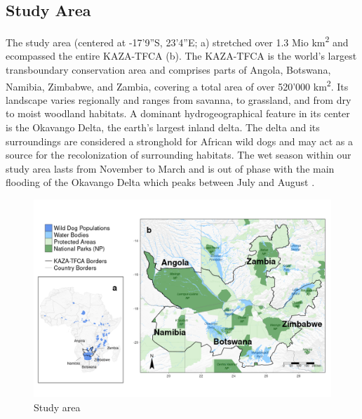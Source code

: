 \documentclass[abstract=on,10pt,a4paper,bibliography=totocnumbered]{article}
\begin{document}
\subsection{Study Area}
The study area (centered at -17'9''S, 23'4''E;
a) stretched over 1.3 Mio km\textsuperscript{2} and ecompassed
the entire KAZA-TFCA (b). The KAZA-TFCA is the world's largest
transboundary conservation area and comprises parts of Angola, Botswana,
Namibia, Zimbabwe, and Zambia, covering a total area of over 520'000
km\textsuperscript{2}. Its landscape varies regionally and ranges from savanna,
to grassland, and from dry to moist woodland habitats. A dominant
hydrogeographical feature in its center is the Okavango Delta, the earth's
largest inland delta. The delta and its surroundings are considered a stronghold
for African wild dogs and may act as a source for the recolonization of
surrounding habitats. The wet season within our study area lasts from November
to March and is out of phase with the main flooding of the Okavango Delta which
peaks between July and August \citep{McNutt.1996, Wolski.2017}.

\begin{figure}[htbp]
  \begin{center}
    \includegraphics[width = \textwidth]{99_StudyArea.png}
    \caption{Study area}
    \label{StudyArea}
  \end{center}
\end{figure}
\end{document}
